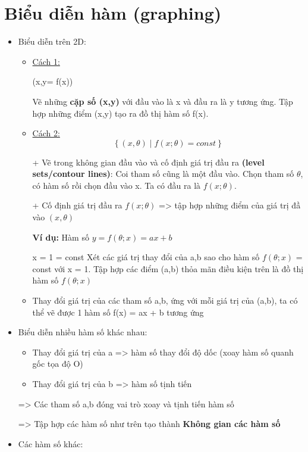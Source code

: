 \documentclass{article}
\begin{document}
\section{Biểu diễn hàm (graphing)}
\begin{itemize}
    \item Biểu diễn trên 2D: 
    \begin{itemize}
        \item \underline{Cách 1:} 
        
        {(x,y= f(x))} 
        
        Vẽ những \textbf{cặp số (x,y)} với đầu vào là x và đầu ra là y tương ứng. Tập hợp những điểm (x,y) tạo ra đồ thị hàm số f(x).
        \item \underline{Cách 2:} 
        $$\left \{(x, \theta) \mid f(x;\theta) = const   \right \}$$
        
        + Vẽ trong không gian đầu vào và cố định giá trị đầu ra \textbf{(level sets/contour lines)}: Coi tham số cũng là một đầu vào. Chọn tham số $\theta$, có hàm số rồi chọn đầu vào x. Ta có đầu ra là $f(x;\theta)$.
        
        + Cố định giá trị đầu ra $f(x;\theta)$ => tập hợp những điểm của giá trị đầ vào $(x, \theta)$ 
        
        \textbf{Ví dụ:} Hàm số $y=f(\theta;x) = ax + b$
        
        x = 1 = const
        Xét các giá trị thay đổi của a,b sao cho hàm số $f(\theta;x)$ = const với x = 1. Tập hợp các điểm (a,b) thỏa mãn điều kiện trên là đồ thị hàm số $f(\theta;x)$
        
        \item Thay đổi giá trị của các tham số a,b, ứng với mỗi giá trị của (a,b), ta có thể vẽ được 1 hàm số f(x) = ax + b tương ứng 
    
    \end{itemize}
    \item Biểu diễn nhiều hàm số khác nhau: 
    
    \begin{itemize}
        \item Thay đổi giá trị của a => hàm số thay đổi độ dốc (xoay hàm số quanh gốc tọa độ O)
        \item Thay đổi giá trị của b => hàm số tịnh tiến 
    \end{itemize}
     => Các tham số a,b đóng vai trò xoay và tịnh tiến hàm số
     
     => Tập hợp các hàm số như trên tạo thành \textbf{Không gian các hàm số}
\item Các hàm số khác: 


\end{itemize}
\end{document}
